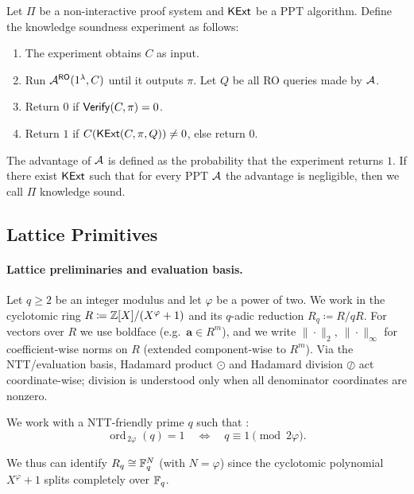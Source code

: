 \begin{definition}
    \label{def:nizk-knowledge}
    Let $\Pi$ be a non-interactive proof system and $\mathsf{KExt}$ be a  PPT algorithm. 
    Define the knowledge soundness experiment as follows:
    \begin{enumerate}
    \item The experiment obtains $C$  as input.
    \item Run $\mathcal{A}^{\mathsf{RO}}(1^\lambda,C)$ until it outputs $\pi$. Let $Q$ be all RO queries made by $\mathcal{A}$.
    \item Return $0$ if $\mathsf{Verify}(C,\pi)=0$.
        \item Return $1$ if   $C(\mathsf{KExt}(C, \pi, Q))\neq 0$, else return $0$.
    \end{enumerate}
    The advantage of $\mathcal{A}$ is defined as the probability that the experiment returns $1$.
    If there exist $\mathsf{KExt}$ such that for every PPT $\mathcal{A}$ the advantage is negligible,     then we call $\Pi$ knowledge sound.

\end{definition}




\subsection{Lattice Primitives}

\paragraph{Lattice preliminaries and evaluation basis.}
Let $q\ge 2$ be an integer modulus and let $\varphi$ be a power of two. We work in the cyclotomic ring
$R \coloneqq \mathbb{Z}[X]/(X^\varphi+1)$ and its $q$-adic reduction $R_q \coloneqq R/qR$. For vectors over $R$ we use
boldface (e.g.\ $\mathbf{a}\in R^m$), and we write $\|\cdot\|_2,\ \|\cdot\|_\infty$ for coefficient-wise norms on $R$
(extended component-wise to $R^m$). Via the NTT/evaluation basis, Hadamard product $\odot$ and Hadamard
division $\oslash$ act coordinate-wise; division is understood only when all denominator coordinates are nonzero.

\medskip
We work with a NTT-friendly prime $q$ such that :
\[
\operatorname{ord}_{\,2\varphi}(q)=1 \quad\Longleftrightarrow\quad q\equiv 1 \pmod{2\varphi}.
\]

We thus can identify $R_q \cong \mathbb{F}_q^{N}$ (with $N=\varphi$) since the cyclotomic polynomial $X^\varphi+1$ splits completely over $\mathbb{F}_q$.

